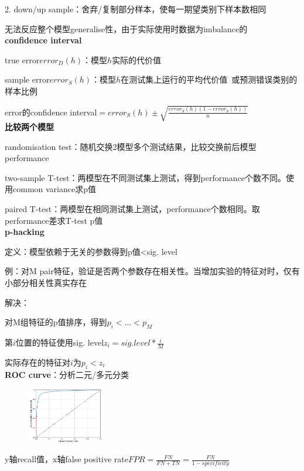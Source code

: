 \documentclass[UTF8]{ctexart}
\begin{document}
  2. down/up sample：舍弃/复制部分样本，使每一期望类别下样本数相同
  
  \quad 无法反应整个模型generalise性，由于实际使用时数据为imbalance的\\
\textbf{confidence interval}

  true error$error_D(h)$：模型$h$实际的代价值

  sample error$error_S(h)$：模型$h$在测试集上运行的平均代价值\ 或预测错误类别的样本比例

  error的confidence interval$= error_S(h) \pm \sqrt{\frac{error_S(h)(1-error_S(h))}{n}}$\\
\textbf{比较两个模型}

  randomisation test：随机交换2模型多个测试结果，比较交换前后模型performance

  two-sample T-test：两模型在不同测试集上测试，得到performance个数不同。使用common variance求p值

  paired T-test：两模型在相同测试集上测试，performance个数相同。取performance差求T-test p值\\
\textbf{p-hacking}

  定义：模型依赖于无关的参数得到p值<sig. level

  \quad 例：对M pair特征，验证是否两个参数存在相关性。当增加实验的特征对时，仅有小部分相关性真实存在

  解决：
  
  \quad 对M组特征的p值排序，得到$p_i < ...< p_M$

  \quad 第$i$位置的特征使用sig. level$z_i = sig. level * \frac{i}{M}$ 

  \quad 实际存在的特征对$i$为$p_i < z_i$\\
\textbf{ROC curve}：分析二元/多元分类

  \begin{figure}[H] %
    \centering %
    \includegraphics[width=0.3\textwidth]{note_images/ROC_curve.png} %
  \end{figure}

  y轴recall值，x轴false positive rate$FPR = \frac{FN}{FN + TN} = \frac{FN}{1-specificity}$
\end{document}
